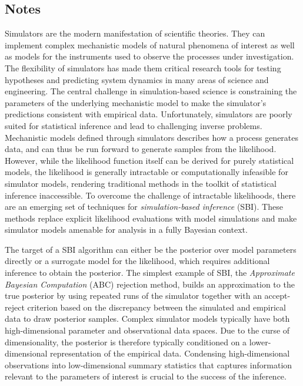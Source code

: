\subsection*{Notes}



Simulators are the modern manifestation of scientific theories. They can implement complex mechanistic models of natural phenomena of interest as well as models for the instruments used to observe the processes under investigation. The flexibility of simulators has made them critical research tools for testing hypotheses and predicting system dynamics in many areas of science and engineering. The central challenge in simulation-based science is constraining the parameters of the underlying mechanistic model to make the simulator's predictions consistent with empirical data. Unfortunately, simulators are poorly suited for statistical inference and lead to challenging inverse problems. Mechanistic models defined through simulators describes how a process generates data, and can thus be run forward to generate samples from the likelihood. However, while the likelihood function itself can be derived for purely statistical models, the likelihood is generally intractable or computationally infeasible for simulator models, rendering traditional methods in the toolkit of statistical inference inaccessible. To overcome the challenge of intractable likelihoods, there are an emerging set of techniques for \textit{simulation-based inference} (SBI). These methods replace explicit likelihood evaluations with model simulations and make simulator models amenable for analysis in a fully Bayesian context.

The target of a SBI algorithm can either be the posterior over model parameters directly or a surrogate model for the likelihood, which requires additional inference to obtain the posterior. The simplest example of SBI, the \textit{Approximate Bayesian Computation} (ABC) rejection method, builds an approximation to the true posterior by using repeated runs of the simulator together with an accept-reject criterion based on the discrepancy between the simulated and empirical data to draw posterior samples. Complex simulator models typically have both high-dimensional parameter and observational data spaces. Due to the curse of dimensionality, the posterior is therefore typically conditioned on a lower-dimensional representation of the empirical data. Condensing high-dimensional observations into low-dimensional summary statistics that captures information relevant to the parameters of interest is crucial to the success of the inference.

